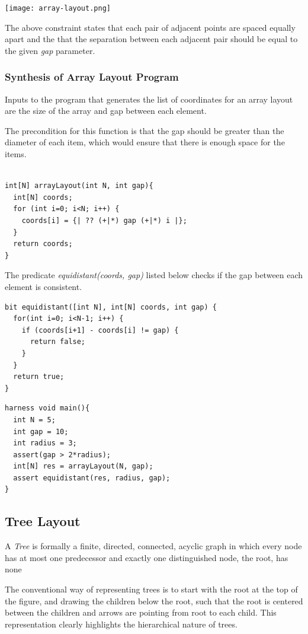 \documentclass{article}
\begin{document}
\texttt{[image: array-layout.png]}

The above constraint states that each pair of adjacent points are
spaced equally apart and the that the separation between each adjacent
pair should be equal to the given \textit{gap} parameter.

\subsubsection{Synthesis of Array Layout Program}

Inputs to the program that generates the list of coordinates for an
array layout are the size of the array and gap between each element.

The precondition for this function is that the gap should be greater
than the diameter of each item, which would ensure that there is
enough space for the items.

\begin{verbatim}

int[N] arrayLayout(int N, int gap){
  int[N] coords;
  for (int i=0; i<N; i++) {
    coords[i] = {| ?? (+|*) gap (+|*) i |};
  }
  return coords;
}
\end{verbatim}

The predicate \textit{equidistant(coords, gap)}
listed below checks if the gap between each element is consistent.

\begin{verbatim}
bit equidistant([int N], int[N] coords, int gap) {
  for(int i=0; i<N-1; i++) {
    if (coords[i+1] - coords[i] != gap) {
      return false;
    }
  }
  return true;
}
\end{verbatim}


\begin{verbatim}
harness void main(){
  int N = 5;
  int gap = 10;
  int radius = 3;
  assert(gap > 2*radius);
  int[N] res = arrayLayout(N, gap);
  assert equidistant(res, radius, gap);
}
\end{verbatim}


\subsection{Tree Layout}

A \textit{Tree}\cite{tidydraw} is formally a finite, directed,
connected, acyclic graph in which every node has at most one
predecessor and exactly one distinguished node, the root, has none

The conventional way of representing trees is to start with the root
at the top of the figure, and drawing the children below the root,
such that the root is centered between the children and arrows are
pointing from root to each child.  This representation clearly
highlights the hierarchical nature of trees.
\end{document}

